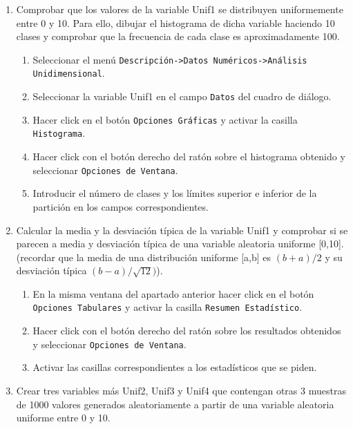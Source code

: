 \documentclass[a4paper]{article}
\begin{document}
\begin{enumerate}[leftmargin=*]
\begin {enumerate}
\item Comprobar que los valores de la variable \textsf{Unif1} se distribuyen
uniformemente entre 0 y 10. Para ello, dibujar el histograma de
dicha variable haciendo 10 clases y comprobar que la
frecuencia de cada clase es aproximadamente 100.
\begin{indicacion}{
\begin{enumerate}
\item Seleccionar el menú \texttt{Descripción->Datos Numéricos->Análisis Unidimensional}.
\item Seleccionar la variable \textsf{Unif1} en el campo \texttt{Datos} del cuadro de diálogo.
\item Hacer click en el botón \texttt{Opciones Gráficas} y activar la casilla \texttt{Histograma}.
\item Hacer click con el botón derecho del ratón sobre el histograma obtenido y seleccionar \texttt{Opciones de Ventana}.
\item Introducir el número de clases y los límites superior e inferior de la partición en los campos correspondientes.
\end{enumerate}}
\end{indicacion}

\item Calcular la media y la desviación típica de la variable Unif1 y comprobar si se parecen a media y desviación típica de una variable aleatoria uniforme [0,10]. (recordar que la media de una distribución uniforme [a,b] es
$(b+a)/2$ y su desviación típica $(b-a)/\sqrt{12})$).
\begin{indicacion}{
\begin{enumerate}
\item En la misma ventana del apartado anterior hacer click en el botón \texttt{Opciones Tabulares} y activar la casilla \texttt{Resumen Estadístico}.
\item Hacer click con el botón derecho del ratón sobre los resultados obtenidos y seleccionar \texttt{Opciones de Ventana}.
\item Activar las casillas correspondientes a los estadísticos que se piden.
\end{enumerate}}
\end{indicacion}

\item Crear tres variables más \textsf{Unif2}, \textsf{Unif3} y \textsf{Unif4} que contengan otras 3 muestras de 1000 valores generados aleatoriamente a partir de una variable aleatoria uniforme entre 0 y 10. 


\end{enumerate}
\end{enumerate}
\end{document}
